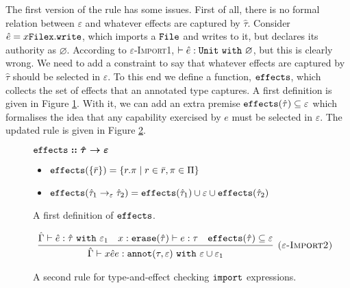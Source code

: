 The first version of the rule has some issues. First of all, there is no formal relation between $\varepsilon$ and whatever effects are captured by $\hat \tau$. Consider $\hat e = {x}{\mathtt{File}}{\mathtt{x.write}}$, which imports a $\mathtt{File}$ and writes to it, but declares its authority as $\varnothing$. According to \textsc{$\varepsilon$-Import1}, $\vdash \hat e: \mathtt{Unit}~\mathtt{with}~ \varnothing$, but this is clearly wrong. We need to add a constraint to say that whatever effects are captured by $\hat \tau$ should be selected in $\varepsilon$. To this end we define a function, $\mathtt{effects}$, which collects the set of effects that an annotated type captures. A first definition is given in Figure \ref{fig:fx_defn}. With it, we can add an extra premise $\mathtt{effects}(\hat \tau) \subseteq \varepsilon$ which formalises the idea that any capability exercised by $e$ must be selected in $\varepsilon$. The updated rule is given in Figure \ref{fig:import_rule_2}.


\begin{figure}[h]

$\bm{\mathtt{effects :: \hat \tau \rightarrow \varepsilon}}$ \begin{itemize}
	\setlength\itemsep{-0.7em}
	\item[] $\mathtt{effects}(\{ \bar r \}) = \{ r.\pi \mid r \in \bar r, \pi \in \Pi \}$
	\item[] $\mathtt{effects}(\hat \tau_1 \rightarrow_{\varepsilon} \hat \tau_2) = \mathtt{effects}(\hat \tau_1) \cup \varepsilon \cup \mathtt{effects}(\hat \tau_2)$
\end{itemize}
\vspace{-7pt}
\caption{A first definition of $\mathtt{effects}$.}
\label{fig:fx_defn}
\end{figure}

\begin{figure}[h]

\[
\begin{array}{c}

\infer[\textsc{($\varepsilon$-Import2)}]
	{ \hat \Gamma \vdash {x}{\hat e}{e}: \kwa{annot}(\tau, \varepsilon)~\kw{with} \varepsilon \cup \varepsilon_1 }
	{ \hat \Gamma \vdash \hat e: \hat \tau~\kw{with} \varepsilon_1 & x: \kwa{erase}(\hat \tau) \vdash e: \tau & \kwa{effects}(\hat \tau) \subseteq \varepsilon}

\end{array}
\]
\vspace{-7pt}
\caption{A second rule for type-and-effect checking $\mathtt{import}$ expressions.}
\label{fig:import_rule_2}
\end{figure}

